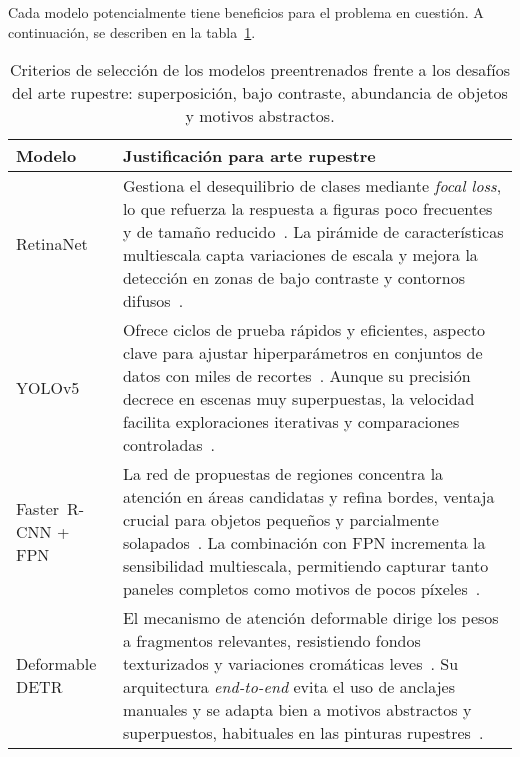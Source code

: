 Cada modelo potencialmente tiene beneficios para el problema en cuestión.
A continuación, se describen en la tabla~\ref{tab:justificacion_modelos}.

\begin{table}[htpb]
    \centering
    \begin{tabular}{p{3.5cm} p{10.8cm}}
        \hline
        \textbf{Modelo} & \textbf{Justificación para arte rupestre} \\
        \hline
        RetinaNet &
        Gestiona el desequilibrio de clases mediante \emph{focal loss}, lo que refuerza la respuesta a figuras poco frecuentes y de tamaño reducido~\cite{lin2017focal,suhaimi2023}.
        La pirámide de características multiescala capta variaciones de escala y mejora la detección en zonas de bajo contraste y contornos difusos~\cite{esri_retinanet,wunderlich2023}. \\[0.4em]

        YOLOv5 &
        Ofrece ciclos de prueba rápidos y eficientes, aspecto clave para ajustar hiperparámetros en conjuntos de datos con miles de recortes~\cite{yolov5,suhaimi2023}.
        Aunque su precisión decrece en escenas muy superpuestas, la velocidad facilita exploraciones iterativas y comparaciones controladas~\cite{li2022}. \\[0.4em]

        Faster~R-CNN + FPN &
        La red de propuestas de regiones concentra la atención en áreas candidatas y refina bordes, ventaja crucial para objetos pequeños y parcialmente solapados~\cite{ren2015faster}.
        La combinación con FPN incrementa la sensibilidad multiescala, permitiendo capturar tanto paneles completos como motivos de pocos píxeles~\cite{suhaimi2023}. \\[0.4em]

        Deformable DETR &
        El mecanismo de atención deformable dirige los pesos a fragmentos relevantes, resistiendo fondos texturizados y variaciones cromáticas leves~\cite{zhu2021,smallobjDETR}.
        Su arquitectura \emph{end-to-end} evita el uso de anclajes manuales y se adapta bien a motivos abstractos y superpuestos, habituales en las pinturas rupestres~\cite{horn2022ai}. \\
    \end{tabular}
    \caption{Criterios de selección de los modelos preentrenados frente a los desafíos del arte rupestre: superposición, bajo contraste, abundancia de objetos y motivos abstractos.}
    \label{tab:justificacion_modelos}
\end{table}


